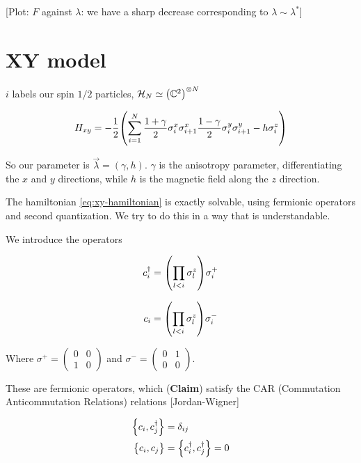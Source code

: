 \documentclass[main.tex]{subfiles}
\begin{document}
[Plot: \(F\) against \(\lambda\): we have a sharp decrease corresponding to \(\lambda \sim \lambda^*\)]

\section{XY model}

\(i\) labels our spin \(1/2\) particles,  \(\mathcal{H}_N \simeq \qty(\mathbb{C}^2)^{\otimes N} \)

\begin{equation} \label{eq:xy-hamiltonian}
  H_{xy} = -\frac{1}{2} \qty(\sum _{i=1}   ^{N} \frac{1 + \gamma}{2} \sigma_i ^x \sigma_{i+1}^x \frac{1-\gamma}{2} \sigma^y_i \sigma_{i+1}^y - h \sigma_i^{z} )
\end{equation}

So our parameter is \(\vec{\lambda} = (\gamma, h) \). \(\gamma\) is the anisotropy parameter, differentiating the \(x\) and \(y \) directions, while \(h\) is the magnetic field along the \(z\) direction.

The hamiltonian \eqref{eq:xy-hamiltonian} is exactly solvable, using fermionic operators and second quantization. We try to do this in a way that is understandable.

We introduce the operators

\begin{equation}
    c_i ^\dag = \qty(\prod _{l<i} \sigma_l^z) \sigma_i^+
\end{equation}

\begin{equation}
    c_i  = \qty(\prod _{l<i} \sigma_l^z) \sigma_i^-
\end{equation}

Where \(\sigma^+  = \begin{pmatrix}
    0 & 0 \\
    1 & 0
\end{pmatrix}\) and \(\sigma^-  = \begin{pmatrix}
    0 & 1 \\ 0 & 0
\end{pmatrix}\).

These are fermionic operators, which (\textbf{Claim})  satisfy the CAR (Commutation Anticommutation Relations) relations [Jordan-Wigner]

\begin{subequations}
\begin{align}
  \qty{c_i, c_j^\dag} &= \delta _{ij}   \\
  \qty{c_i, c_j} &= \qty{c_i^\dag, c_j^\dag} = 0
\end{align}
\end{subequations}
\end{document}
